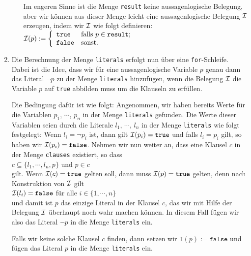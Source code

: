 \begin{enumerate}
\begin{enumerate}
            Im engeren Sinne ist die Menge \texttt{result} keine aussagenlogische Belegung, aber wir
            k\"{o}nnen aus dieser Menge leicht eine aussagenlogische Belegung $\mathcal{I}$ erzeugen, indem
            wir $\mathcal{I}$ wie folgt definieren: 
            \\[0.2cm]
            \hspace*{1.3cm}
            $\mathcal{I}(p) := \left\{
            \begin{array}{ll}
              \texttt{true} & \mbox{falls $p \in \texttt{result}$;}  \\
              \texttt{false} & \mbox{sonst.}
            \end{array}
            \right.
            $
      \end{enumerate}
\item Die Berechnung der Menge \texttt{literals} erfolgt nun \"{u}ber eine \texttt{for}-Schleife.
      Dabei ist die Idee, dass wir f\"{u}r eine aussagenlogische Variable $p$ genau dann das Literal
      $\neg p$ zu der Menge \texttt{literals} hinzuf\"{u}gen, wenn die Belegung $\mathcal{I}$ die Variable $p$
      auf \texttt{true} abbilden muss um die Klauseln zu erf\"{u}llen.  

      Die Bedingung daf\"{u}r ist wie folgt: Angenommen, wir haben bereits Werte f\"{u}r die Variablen
      $p_1$, $\cdots$, $p_n$ in der Menge \texttt{literals}  gefunden.
      Die Werte dieser Variablen seien durch die Literale $l_1$, $\cdots$, $l_n$ in der Menge \texttt{literals}
      wie folgt festgelegt: Wenn $l_i = \neg p_i$ ist, dann gilt $\mathcal{I}(p_i) = \texttt{true}$ 
      und falls $l_i = p_i$ gilt, so haben wir $\mathcal{I}(p_i) = \texttt{false}$.
      Nehmen wir nun weiter an, dass eine Klausel $c$ in der Menge \texttt{clauses} existiert, so dass
      \\[0.2cm]
      \hspace*{1.3cm}
      $c \subseteq \{ l_1, \cdots, l_n, p \}$ \quad und \quad $p \in c$
      \\[0.2cm]
      gilt.  Wenn $\mathcal{I}(c) = \texttt{true}$ gelten soll, dann muss $\mathcal{I}(p) = \texttt{true}$ gelten, denn
      nach Konstruktion von $\mathcal{I}$ gilt 
      \\[0.2cm]
      \hspace*{1.3cm}
      $\mathcal{I}(l_i) = \texttt{false}$ \quad f\"{u}r alle $i \in \{1,\cdots,n\}$
      \\[0.2cm]
      und damit ist $p$ das einzige Literal in der Klausel $c$, das wir mit Hilfe der Belegung $\mathcal{I}$
      \"{u}berhaupt noch wahr machen k\"{o}nnen.  In diesem Fall f\"{u}gen wir also das Literal
      $\neg p$ in die Menge \texttt{literals} ein. 

      Falls wir keine solche Klausel $c$ finden, dann setzen wir $\texttt{I}(p) := \texttt{false}$
      und f\"{u}gen das Literal $p$ in die Menge \texttt{literals} ein.
\end{enumerate}

